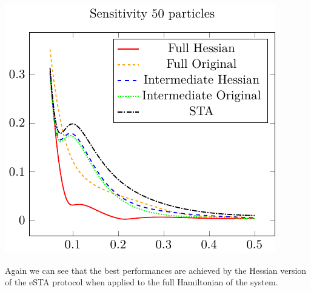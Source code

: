 \begin{center}
	\includegraphics{./gfx/sensitivity_np50_nlambda5.pdf}
\end{center}



Again we can see that the best performances are achieved by the Hessian version of the eSTA protocol when applied to the full Hamiltonian of the system.

